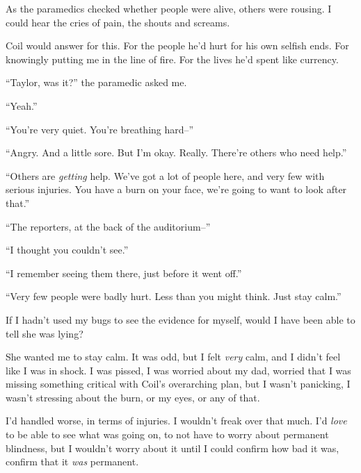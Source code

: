 As the paramedics checked whether people were alive, others were rousing.  I could hear the cries of pain, the shouts and screams.



Coil would answer for this.  For the people he'd hurt for his own selfish ends.  For knowingly putting me in the line of fire.  For the lives he'd spent like currency.



``Taylor, was it?'' the paramedic asked me.



``Yeah.''



``You're very quiet.  You're breathing hard--''



``Angry.  And a little sore.  But I'm okay.  Really.  There're others who need help.''



``Others are \emph{getting} help.  We've got a lot of people here, and very few with serious injuries.  You have a burn on your face, we're going to want to look after that.''



``The reporters, at the back of the auditorium--''



``I thought you couldn't see.''



``I remember seeing them there, just before it went off.''



``Very few people were badly hurt.  Less than you might think.  Just stay calm.''



If I hadn't used my bugs to see the evidence for myself, would I have been able to tell she was lying?



She wanted me to stay calm.  It was odd, but I felt \emph{very} calm, and I didn't feel like I was in shock.  I was pissed, I was worried about my dad, worried that I was missing something critical with Coil's overarching plan, but I wasn't panicking, I wasn't stressing about the burn, or my eyes, or any of that.



I'd handled worse, in terms of injuries.  I wouldn't freak over that much.  I'd\emph{ love} to be able to see what was going on, to not have to worry about permanent blindness, but I wouldn't worry about it until I could confirm how bad it was, confirm that it \emph{was} permanent.




